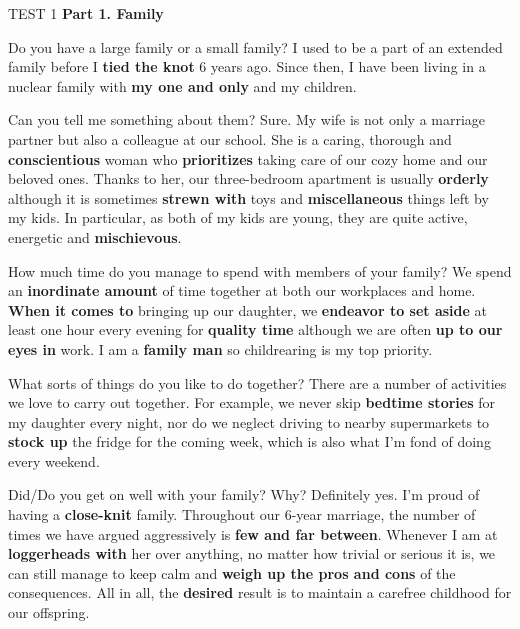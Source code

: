 \begin{glossarymc}[Cambridge 3]

\begin{test}{TEST 1}
\textbf{Part 1. Family}
    \begin{qa}{Do you have a large family or a small family?}
        I used to be a part of an extended family before I \textbf{tied the knot} 6 years ago. 
        Since then, I have been living in a nuclear family with \textbf{my one and only} and my children.
    \end{qa}

    \begin{qa}{Can you tell me something about them?}
        Sure. My wife is not only a marriage partner but also a colleague at our school. 
        She is a caring, thorough and \textbf{conscientious} woman who \textbf{prioritizes} taking care of our cozy home and our beloved ones. 
        Thanks to her, our three-bedroom apartment is usually \textbf{orderly} although it is sometimes \textbf{strewn with} toys and \textbf{miscellaneous} things left by my kids. 
        In particular, as both of my kids are young, they are quite active, energetic and \textbf{mischievous}.
    \end{qa}

    \begin{qa}{How much time do you manage to spend with members of your family?}
        We spend an \textbf{inordinate amount} of time together at both our workplaces and home. 
        \textbf{When it comes to} bringing up our daughter, we \textbf{endeavor to set aside} at least one hour every evening for \textbf{quality time} although we are often \textbf{up to our eyes in} work. 
        I am a \textbf{family man} so childrearing is my top priority.
    \end{qa}

    \begin{qa}{What sorts of things do you like to do together?}
        There are a number of activities we love to carry out together. 
        For example, we never skip \textbf{bedtime stories} for my daughter every night, nor do we neglect driving to nearby supermarkets to \textbf{stock up} the fridge for the coming week, which is also what I'm fond of doing every weekend.
    \end{qa}

    \begin{qa}{Did/Do you get on well with your family? Why?}
        Definitely yes. I'm proud of having a \textbf{close-knit} family. 
        Throughout our 6-year marriage, the number of times we have argued aggressively is \textbf{few and far between}. 
        Whenever I am at \textbf{loggerheads with} her over anything, no matter how trivial or serious it is, we can still manage to keep calm and \textbf{weigh up the pros and cons} of the consequences. 
        All in all, the \textbf{desired} result is to maintain a carefree childhood for our offspring.
    \end{qa}


\end{test}
\end{glossarymc}
